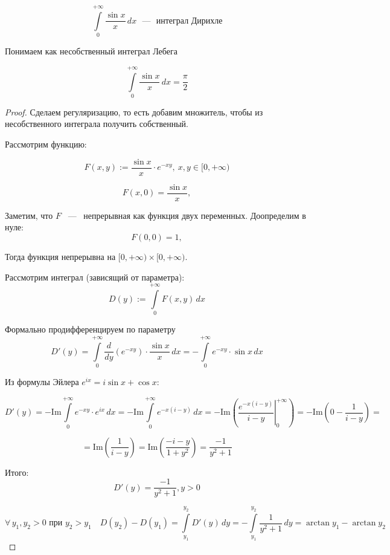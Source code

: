 \[
    \int\limits_0^{+\infty} \frac{\sin x}{x} \, dx \text{ ~---~ интеграл Дирихле}
\]

\begin{note}
Понимаем как несобственный интеграл Лебега
\end{note}

\begin{theorem}
\[
    \int\limits_0^{+\infty} \frac{\sin x}{x} \, dx = \frac{\pi}{2}
\]

\end{theorem}

\begin{proof}

\noindent Сделаем регуляризацию, то есть добавим множитель, чтобы из несобственного интеграла получить собственный. 

\noindent Рассмотрим функцию:

\[
F(x, y) := \frac{\sin x}{x} \cdot e^{-x y}, \ x, y \in [0, +\infty)
\]

\[
F(x, 0) = \frac{\sin x}{x},
\]

\noindent Заметим, что $F$ ~---~ непрерывная как функция двух переменных. Доопределим в нуле:
\[
F(0, 0) = 1,  
\]

\noindent Тогда функция непрерывна на $[0, +\infty) \times [0, +\infty)$. 

Рассмотрим интеграл (зависящий от параметра): 
\[
D(y) := \int\limits_0^{+\infty}F(x, y) \,d x
\]


\noindent Формально продифференцируем по параметру
\[
    D'(y) = \int\limits_0^{+\infty} \frac{d}{dy} \left( e^{-x y} \right) \cdot \frac{\sin x}{x} \, dx = - \int\limits_0^{+\infty} e^{-x y} \cdot \sin x \, dx
\]

\noindent Из формулы Эйлера $e^{ix} = i \sin x + \cos x$:

\[
D'(y) = -\mathrm{Im} \int\limits_0^{+\infty} e^{-xy} \cdot e^{ix} \, dx
= -\mathrm{Im} \int\limits_0^{+\infty} e^{-x(i - y)}\, dx
= -\mathrm{Im} \left( \left. \frac{e^{-x(i - y)}}{i - y} \right|_0^{+\infty} \right) = -\mathrm{Im}\left( 0 - \frac{1}{i-y}\right) =
\]

\[
= \mathrm{Im} \left( \frac{1}{i - y} \right) = \mathrm{Im} \left( \frac{-i - y}{1 + y^2} \right)
= \frac{-1}{y^2 + 1}
\] 

\noindent Итого:
\[
D'(y) = \frac{-1}{y^2 + 1}, y > 0
\]

\[
\forall\, y_1, y_2 > 0 \text{ при } y_2 > y_1 \quad
D(y_2) - D(y_1) = \int\limits_{y_1}^{y_2} D'(y) \, dy
= - \int\limits_{y_1}^{y_2} \frac{1}{y^2 + 1} \, dy = \arctan{y_1} - \arctan{y_2}
\]


\end{proof}
